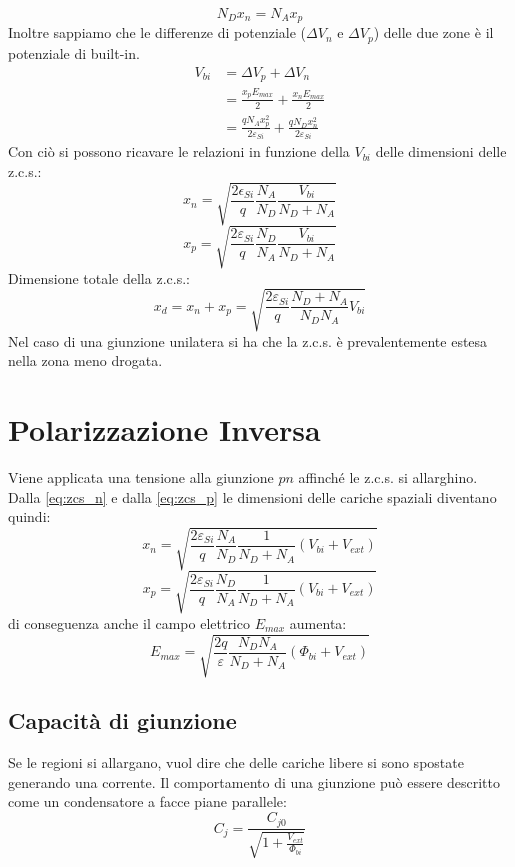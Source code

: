 \documentclass{article}
\begin{document}
\begin{equation*}
N_Dx_n = N_Ax_p
\end{equation*}
Inoltre sappiamo che le differenze di potenziale ($\Delta V_n$ e $\Delta V_p$) delle due zone è il potenziale di built-in.
\begin{align*}
V_{bi} &= \Delta V_p + \Delta V_n\\
&= \frac{x_p E_{max}}{2} + \frac{x_n E_{max}}{2}\\
&= \frac{qN_Ax_p^2}{2\varepsilon_{Si}} + \frac{qN_Dx_n^2}{2\varepsilon_{Si}}
\end{align*}
Con ciò si possono ricavare le relazioni in funzione della $V_{bi}$ delle dimensioni delle z.c.s.:
\begin{equation} \label{eq:zcs_n}
x_n = \sqrt{\frac{2\epsilon_{Si}}{q} \frac{N_A}{N_D} \frac{V_{bi}}{N_D+N_A}}
\end{equation}
\begin{equation} \label{eq:zcs_p}
x_p = \sqrt{\frac{2\varepsilon_{Si}}{q} \frac{N_D}{N_A} \frac{V_{bi}}{N_D+N_A}}
\end{equation}
Dimensione totale della z.c.s.:
\begin{equation*}
x_d = x_n + x_p = \sqrt{\frac{2\varepsilon_{Si}}{q} \frac{N_D+N_A}{N_DN_A} V_{bi}}
\end{equation*}
Nel caso di una giunzione unilatera si ha che la z.c.s. è prevalentemente estesa nella zona meno drogata.

\section*{Polarizzazione Inversa}
Viene applicata una tensione alla giunzione $pn$ affinché le z.c.s. si allarghino. Dalla \eqref{eq:zcs_n} e dalla \eqref{eq:zcs_p} le dimensioni delle cariche spaziali diventano quindi:
\begin{equation*}
x_n = \sqrt{\frac{2\varepsilon_{Si}}{q} \frac{N_A}{N_D} \frac{1}{N_D+N_A} (V_{bi} + V_{ext})}
\end{equation*}
\begin{equation*}
x_p = \sqrt{\frac{2\varepsilon_{Si}}{q} \frac{N_D}{N_A} \frac{1}{N_D+N_A} (V_{bi} + V_{ext})}
\end{equation*}
di conseguenza anche il campo elettrico $E_{max}$ aumenta:
\begin{equation*}
E_{max} = \sqrt{\frac{2q}{\varepsilon} \frac{N_D N_A}{N_D + N_A} (\Phi_{bi} + V_{ext})}
\end{equation*}

\subsection*{Capacità di giunzione}
Se le regioni si allargano, vuol dire che delle cariche libere si sono spostate generando una corrente.
Il comportamento di una giunzione può essere descritto come un condensatore a facce piane parallele:
\begin{equation*}
C_j = \frac{C_{j0}}{\sqrt{1 + \frac{V_{ext}}{\Phi_{bi}}}}
\end{equation*}
\end{document}
